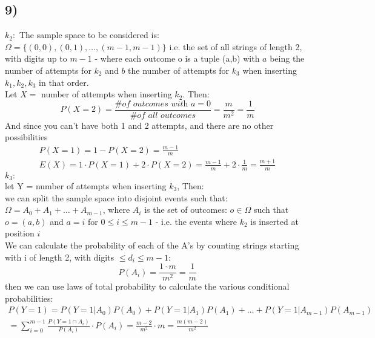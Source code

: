 \documentclass{report}
\begin{document}
\subsection*{9)}
$k_{2}:$
The sample space to be considered is: $\Omega = \{(0,0),(0,1),\hdots,(m-1,m-1)\}$ i.e. the set of all strings of length 2, with digits up to $m-1$ - where each outcome o is a tuple (a,b) with $a$ being the number of attempts for $k_{2}$ and $b$ the number of attempts for $k_{3}$ when inserting $k_{1},k_{2},k_{3}$ in that order.\medskip\\ Let $X =$ number of attempts when inserting $k_{2}$. Then:
\begin{equation*}
    P(X = 2) = \frac{\textit{\# of outcomes with }a = 0 }{\textit{\# of all outcomes}} = \frac{m}{m^{2}} = \frac{1}{m} 
\end{equation*}
 And since you can't have both 1 and 2 attempts, and there are no other possibilities
 \begin{align*}
     P(X = 1) = 1 - P(X = 2) = \frac{m-1}{m}\\
     E(X) = 1\cdot P(X=1) + 2\cdot P(X=2) = \frac{m-1}{m} + 2 \cdot\frac{1}{m} =  \frac{m+1}{m}
 \end{align*}
\medskip
$k_{3}:$\\
let Y = number of attempts when inserting $k_{3}$, Then:\medskip\\
we can split the sample space into disjoint events such that: $\Omega = A_{0} + A_{1} + \hdots + A_{m-1}$, where $A_{i}$ is the set of outcomes: $o \in \Omega$ such that $o = (a,b)$ and $a = i$ for $0 \leq i \leq m -1$ - i.e. the events where $k_{2}$ is inserted at position $i$\medskip\\
We can calculate the probability of each of the A's by counting strings starting with i of length 2, with digits $\leq d_{i} \leq m-1$:
\begin{equation*}
    P(A_{i}) = \frac{1\cdot m}{m^{2}} = \frac{1}{m}
\end{equation*}
then we can use laws of total probability to calculate the various conditional probabilities:
\begin{gather*}
    P(Y = 1) = P(Y = 1 | A_{0})P(A_{0}) + P(Y = 1 | A_{1})P(A_{1}) + \hdots + P(Y = 1 | A_{m-1})P(A_{m-1})\\
    = \sum_{i = 0}^{m-1} \frac{P(Y = 1 \cap A_{i})}{P(A_{i})}\cdot P(A_{i}) = \frac{m-2}{m^{2}}\cdot m = \frac{m(m-2)}{m^{2}}
\end{gather*}
\end{document}
